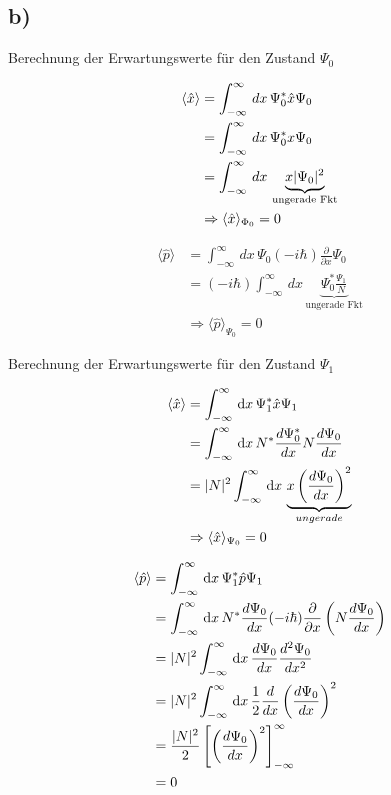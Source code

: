 \subsection{b)}

Berechnung der Erwartungswerte für den Zustand $\Psi _0$

\begin{align}
    \langle\hat x \rangle &= \int_{-\infty}^{\infty}\,dx\, \Psi _0^* \hat x \Psi _0\\
    &= \int_{-\infty}^{\infty} \,dx\, \Psi _0^* x \Psi _0\\
    &= \int_{-\infty}^{\infty} \,dx\, \underbrace{x \lvert\Psi _0\rvert^2}_{\text{ungerade Fkt}}\\
    &\Rightarrow \langle\hat x\rangle_{\Phi _0}=0
\end{align}


\begin{align}
    \langle\hat p \rangle &= \int_{-\infty}^{\infty}\,dx\, \Psi _0 (-i\hbar)\frac{\partial}{\partial x} \Psi _0 \\
    &= (-i \hbar)\int_{-\infty}^{\infty}\,dx\, \underbrace{\Psi_0^* \frac{\Psi _1}{N}}_{\text{ungerade Fkt}}\\
    &\Rightarrow \langle\hat p\rangle_{\Psi _0} = 0
\end{align}

Berechnung der Erwartungswerte für den Zustand $\Psi _1$

\begin{align}
\langle\hat x\rangle &=\int_{-\infty}^{\infty} \,\mathrm{d}x\, \Psi_1^* \hat x \Psi _1\\
&=\int_{-\infty}^{\infty} \,\mathrm{d}x\, N^* \frac{d\Psi _0^*}{dx} N \frac{d\Psi _0}{dx}\\
&=\lvert N\rvert^2 \int_{-\infty}^{\infty} \,\mathrm{d}x\, \underbrace{x \left(\frac{d \Psi _0}{dx} \right)^2}_{ungerade}\\
&\Rightarrow \langle\hat x\rangle_{\Psi _0} = 0
\end{align}

\begin{align}
    \langle\hat p \rangle &=\int_{-\infty}^{\infty} \,\mathrm{d}x\, \Psi _1^* \hat p \Psi _1\\
    &= \int_{-\infty}^{\infty} \,\mathrm{d}x\, N^* \frac{d \Psi _0}{dx} (-i\hbar) \frac{\partial}{\partial x}\left(N \frac{d \Psi _0}{dx}\right)\\
    &= \lvert N\rvert^2 \int_{-\infty}^{\infty} \,\mathrm{d}x\, \frac{d \Psi _0}{dx} \frac{d^2 \Psi _0}{dx^2}\\
    &=\lvert N\rvert^2 \int_{-\infty}^{\infty} \,\mathrm{d}x\, \frac{1}{2} \frac{d}{dx} \left(\frac{d\Psi _0}{dx}\right)^2\\
    &= \frac{\lvert N\rvert^2}{2} \left[ \left(\frac{d\Psi _0}{dx}\right)^2\right]_{-\infty}^{\infty}\\
    &=0
\end{align}

